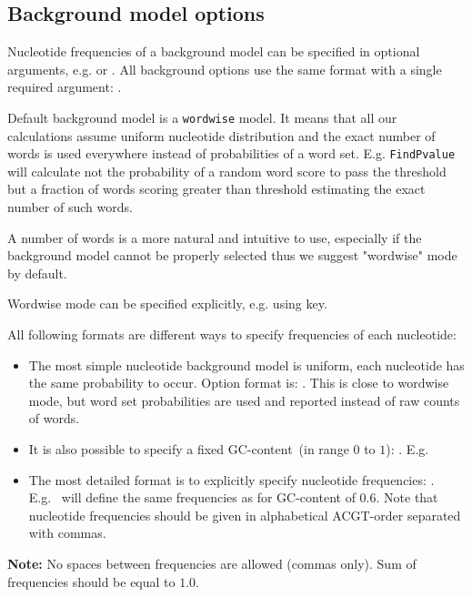 \subsection{Background model options}
Nucleotide frequencies of a background model can be specified in optional arguments, e.g.  or . All background options use the same format with a single required argument: .

Default background model is a \texttt{wordwise} model. It means that all our calculations assume uniform nucleotide distribution and the exact number of words is used everywhere instead of probabilities of a word set.
E.g. \texttt{FindPvalue} will calculate not the probability of a random word score to pass the threshold but a fraction of words scoring greater than threshold estimating the exact number of such words.

A number of words is a more natural and intuitive to use, especially if the background model cannot be properly selected
thus we suggest "wordwise" mode by default.

Wordwise mode can be specified explicitly, e.g. using  key.

All following formats are different ways to specify frequencies of each nucleotide:
\begin{itemize}
\item The most simple nucleotide background model is uniform, each nucleotide has the same probability to occur. Option format is: . This is close to wordwise mode, but word set probabilities are used and reported instead of raw counts of words.
\item It is also possible to specify a fixed GC-content~(in range $0$ to $1$): . E.g.~
\item The most detailed format is to explicitly specify nucleotide frequencies: . E.g.~ will define the same frequencies as for GC-content of $0.6$. Note that nucleotide frequencies should be given in alphabetical ACGT-order separated with commas. 
\end{itemize}

\textbf{Note:} No spaces between frequencies are allowed (commas only). Sum of frequencies should be equal to $1.0$.
